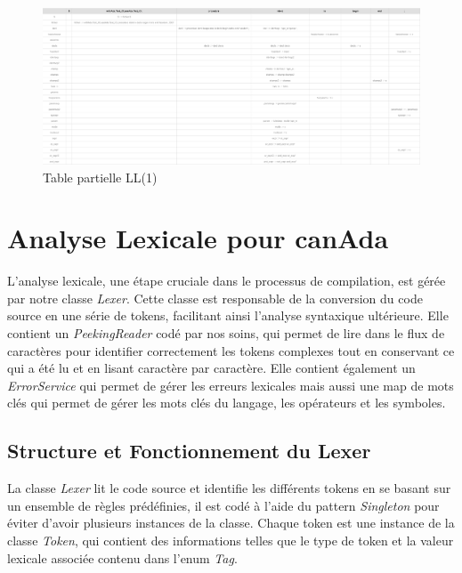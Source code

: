 \documentclass[french,a4paper]{article}
\begin{document}
    \begin{figure}[H]
        \centering
        \includegraphics[width=1\textwidth]{partial_table}
        \caption{Table partielle LL(1)}\label{fig:figure2}
    \end{figure}

    \section{Analyse Lexicale pour canAda}\label{sec:analyse-lexicale-pour-canada}

    L'analyse lexicale, une étape cruciale dans le processus de compilation, est gérée par notre classe \textit{Lexer}.
    Cette classe est responsable de la conversion du code source en une série de tokens, facilitant ainsi l'analyse syntaxique ultérieure.
    Elle contient un \textit{PeekingReader} codé par nos soins, qui permet de lire dans le flux de caractères pour identifier correctement les tokens complexes tout en conservant ce qui a été lu et en lisant caractère par caractère.
    Elle contient également un \textit{ErrorService} qui permet de gérer les erreurs lexicales mais aussi une map de mots clés qui permet de gérer les mots clés du langage, les opérateurs et les symboles.

    \subsection{Structure et Fonctionnement du Lexer}\label{subsec:structure-et-fonctionnement-du-lexer}

    La classe \textit{Lexer} lit le code source et identifie les différents tokens en se basant sur un ensemble de règles prédéfinies, il est codé à l'aide du pattern \textit{Singleton} pour éviter d'avoir plusieurs instances de la classe.
    Chaque token est une instance de la classe \textit{Token}, qui contient des informations telles que le type de token et la valeur lexicale associée contenu dans l'enum \textit{Tag}.
\end{document}
